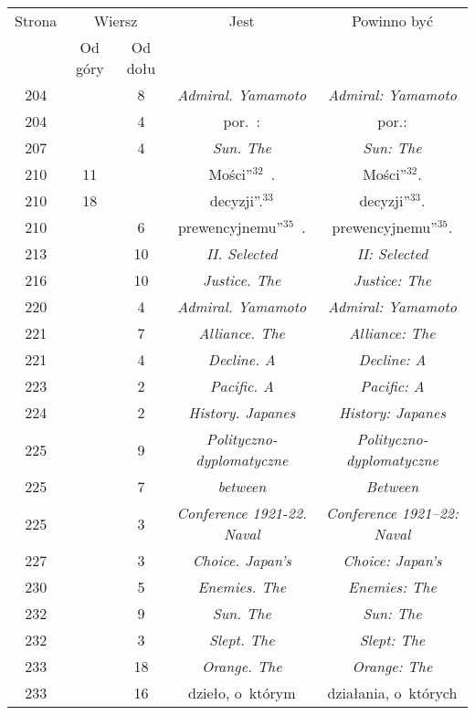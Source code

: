 \documentclass[a4paper,11pt]{article}
\numberwithin{equation}{section}
\begin{document}
\begin{center}
  \begin{tabular}{|c|c|c|c|c|}
    \hline
    Strona & \multicolumn{2}{c|}{Wiersz} & Jest
                              & Powinno być \\ \cline{2-3}
    & Od góry & Od dołu & & \\
    \hline
    204 & &  8 & \textit{Admiral. Yamamoto} & \textit{Admiral: Yamamoto} \\
    204 & &  4 & por.~: & por.: \\
    207 & &  4 & \textit{Sun. The} & \textit{Sun: The} \\
    210 & 11 & & Mości”$^{ 32 }$~. & Mości”$^{ 32 }$. \\
    210 & 18 & & decyzji”.$^{ 33 }$ & decyzji”$^{ 33 }$. \\
    210 & &  6 & prewencyjnemu”$^{ 35 }$~. & prewencyjnemu”$^{ 35 }$. \\
    213 & & 10 & \textit{II. Selected} & \textit{II: Selected} \\
    216 & & 10 & \textit{Justice. The} & \textit{Justice: The} \\
    220 & &  4 & \textit{Admiral. Yamamoto} & \textit{Admiral: Yamamoto} \\
    221 & &  7 & \textit{Alliance. The} & \textit{Alliance: The} \\
    221 & &  4 & \textit{Decline. A} & \textit{Decline: A} \\
    223 & &  2 & \textit{Pacific. A} & \textit{Pacific: A} \\
    224 & &  2 & \textit{History. Japanes} & \textit{History: Japanes} \\
    225 & &  9 & \textit{Polityczno- dyplomatyczne}
           & \textit{Polityczno-dyplomatyczne} \\
    225 & &  7 & \textit{between} & \textit{Between} \\
    225 & &  3 & \textit{Conference 1921-22. Naval}
           & \textit{Conference 1921--22: Naval} \\
    227 & &  3 & \textit{Choice. Japan's} & \textit{Choice: Japan's} \\
    230 & &  5 & \textit{Enemies. The} & \textit{Enemies: The} \\
    232 & &  9 & \textit{Sun. The} & \textit{Sun: The} \\
    232 & &  3 & \textit{Slept. The} & \textit{Slept: The} \\
    233 & & 18 & \textit{Orange. The} & \textit{Orange: The} \\
    233 & & 16 & dzieło, o~którym & działania, o~których \\

\end{tabular}
\end{center}
\end{document}
